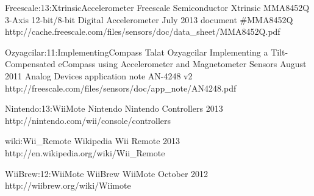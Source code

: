 \newdocref
    {Freescale:13:XtrinsicAccelerometer}
    {{Freescale Semiconductor}}
    {Xtrinsic MMA8452Q 3-Axis 12-bit/8-bit Digital Accelerometer}
    {July}
    {2013}
    {document \#MMA8452Q}
    {http://cache.freescale.com/files/sensors/doc/data_sheet/MMA8452Q.pdf}

\newdocref
    {Ozyagcilar:11:ImplementingCompass}
    {Talat Ozyagcilar}
    {Implementing a Tilt-Compensated eCompass using Accelerometer and Magnetometer Sensors}
    {August}
    {2011}
    {Analog Devices application note AN-4248 v2}
    {http://freescale.com/files/sensors/doc/app_note/AN4248.pdf}



\newlinkref
    {Nintendo:13:WiiMote}
    {Nintendo}
    {{Nintendo Controllers}}
    {}
    {2013}
    {}
    {http://nintendo.com/wii/console/controllers}

\newlinkref
    {wiki:Wii_Remote}
    {Wikipedia}
    {{Wii Remote}}
    {}
    {2013}
    {}
    {http://en.wikipedia.org/wiki/Wii_Remote}

\newlinkref
    {WiiBrew:12:WiiMote}
    {WiiBrew}
    {WiiMote}
    {October}
    {2012}
    {}
    {http://wiibrew.org/wiki/Wiimote}
